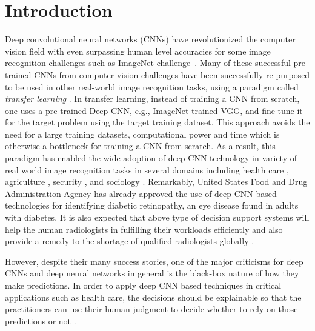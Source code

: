 \section{Introduction}
Deep convolutional neural networks (CNNs) \cite{alexnet, vggnet, resnet, inception} have revolutionized the computer vision field with even surpassing human level accuracies for some image recognition challenges such as ImageNet challenge~\cite{imagenet}.
Many of these successful pre-trained CNNs from computer vision challenges have been successfully re-purposed to be used in other real-world image recognition tasks, using a paradigm called \textit{transfer learning} \cite{transfer-learning-factors}.
In transfer learning, instead of training a CNN from scratch, one uses a pre-trained Deep CNN, e.g., ImageNet trained VGG, and fine tune it for the target problem using the target training dataset.
This approach avoids the need for a large training datasets, computational power and time which is otherwise a bottleneck for training a CNN from scratch.
As a result, this paradigm has enabled the wide adoption of deep CNN technology in variety of real world image recognition tasks in several domains including health care \cite{kermany2018identifying, islam2017abnormality}, agriculture \cite{mohanty2016using}, security \cite{arbabzadah2016identifying}, and sociology \cite{wang2017deep}.
Remarkably, United States Food and Drug Administration Agency has already approved the use of deep CNN based technologies for identifying diabetic retinopathy, an eye disease found in adults with diabetes.
It is also expected that above type of decision support systems will help the human radiologists in fulfilling their workloads efficiently and also provide a remedy to the shortage of qualified radiologists globally \cite{radiologistshortage}.

However, despite their many success stories, one of the major criticisms for deep CNNs and deep neural networks in general is the black-box nature of how they make predictions.
In order to apply deep CNN based techniques in critical applications such as health care, the decisions should be explainable so that the practitioners can use their human judgment to decide whether to rely on those predictions or not \cite{jung2017deep}.

